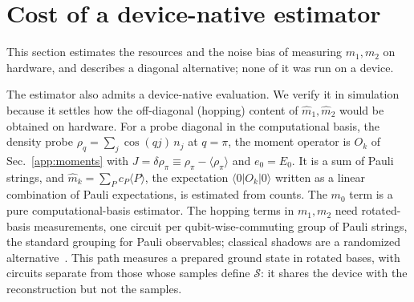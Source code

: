 \documentclass[aps,prb,onecolumn,superscriptaddress,longbibliography,floatfix]{revtex4-2}
\begin{document}
\section{Cost of a device-native estimator}
\label{app:native}
This section estimates the resources and the noise bias of measuring $m_1,m_2$ on hardware, and describes a diagonal alternative; none of it was run on a device.

The estimator also admits a device-native evaluation. We verify it in simulation because it settles how the off-diagonal (hopping) content of $\widehat m_1,\widehat m_2$ would be obtained on hardware. For a probe diagonal in the computational basis, the density probe $\rho_q=\sum_j\cos(qj)\,n_j$ at $q=\pi$, the moment operator is $O_k$ of Sec.~\ref{app:moments} with $J=\delta\rho_\pi\equiv\rho_\pi-\langle\rho_\pi\rangle$ and $e_0=E_0$. It is a sum of Pauli strings, and ${\widehat m_k=\sum_P c_P\langle P\rangle}$, the expectation $\langle 0|O_k|0\rangle$ written as a linear combination of Pauli expectations, is estimated from counts. The $m_0$ term is a pure computational-basis estimator. The hopping terms in $m_1,m_2$ need rotated-basis measurements, one circuit per qubit-wise-commuting group of Pauli strings, the standard grouping for Pauli observables; classical shadows are a randomized alternative~\cite{HuangKuengPreskill2020}. This path measures a prepared ground state in rotated bases, with circuits separate from those whose samples define $\mathcal{S}$: it shares the device with the reconstruction but not the samples.
\end{document}

